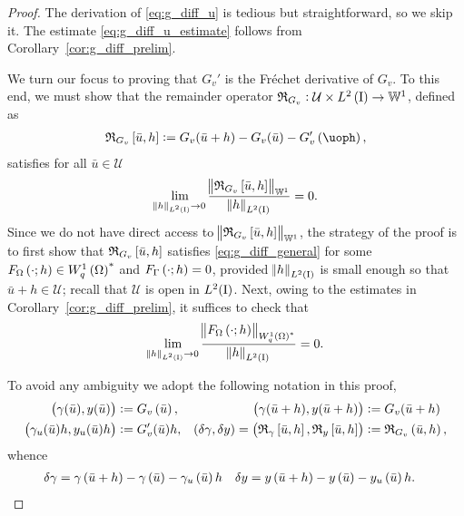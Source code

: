 \documentclass[final]{siamltex}
\begin{document}
\begin{proof} The derivation of \eqref{eq:g_diff_u} is tedious but straightforward, so we skip it. The estimate \eqref{eq:g_diff_u_estimate} follows from Corollary~\ref{cor:g_diff_prelim}.

We turn our focus to proving that $G_v'$ is the Fr\'echet derivative of $G_v$. To this end, we must show that the remainder operator ${\mathfrak{R}}_{G_v}: {\mathcal{U}} \times {{L^2\del{{\text{\rm I}}}}} \to {\mathbb{W}}^1$, defined as
	\begin{align} \label{eq:frechet_deriv}
	    {\mathfrak{R}}_{G_v}\sbr{{\bar{u}}, h} := G_v({\bar{u}} + h) - G_v({\bar{u}}) - G_v'\del\uoph , 
	\end{align}
satisfies for all ${\bar{u}} \in {\mathcal{U}}$
	\[
	     \lim_{{\norm{{h}}_{{L^2\del{{{\text{\rm I}}}}}}} \to 0} \frac{\norm{{\mathfrak{R}}_{G_v}\sbr{{\bar{u}}, h}}_{{\mathbb{W}}^1}}{{\norm{{h}}_{{L^2\del{{{\text{\rm I}}}}}}}}  = 0.
	\]     
Since we do not have direct access to $\norm{{\mathfrak{R}}_{G_v}\sbr{{\bar{u}},
    h}}_{{\mathbb{W}}^1}$, the strategy of the proof is to first show that
${\mathfrak{R}}_{G_v}\sbr{{\bar{u}}, h}$ satisfies  \eqref{eq:g_diff_general} for
some $F_\Omega\del{\cdot;h} \in {{W^{1}_{q}\del{\Omega}}}^*$ and $F_\Gamma\del{\cdot;h} = 0$,
provided ${\norm{{h}}_{{L^2\del{{{\text{\rm I}}}}}}}$ is small enough so that ${\bar{u}} + h \in {\mathcal{U}}$; recall
  that ${\mathcal{U}}$ is open in $L^2({\text{\rm I}})$. Next, owing to the estimates in Corollary~\ref{cor:g_diff_prelim}, it suffices to check that 
	\[
		\lim_{{\norm{{h}}_{{L^2\del{{{\text{\rm I}}}}}}} \to 0} \frac{{\norm{{F_\Omega\del{\cdot;h}}}_{{{W^{{1}}_{{q}}\del{{\Omega}}}}^*}}}{{\norm{{h}}_{{L^2\del{{{\text{\rm I}}}}}}}}  = 0.
	\]
 
To avoid any ambiguity we adopt the following notation in this proof, 
	\begin{align*}
		\del{\gamma({\bar{u}}), y({\bar{u}})} &:= G_v\del{\bar{u}},  &\del{\gamma({\bar{u}}+h), y({\bar{u}}+h)} &:= G_v({\bar{u}}+h) \\
		\del{\gamma_u({\bar{u}})h, y_u({\bar{u}})h} &:= G'_v({\bar{u}})h, &\del{\delta\gamma, \delta y} = \del{{\mathfrak{R}}_\gamma\sbr{{\bar{u}},h},{\mathfrak{R}}_y\sbr{{\bar{u}},h}} &:= {\mathfrak{R}}_{G_v}\del{{\bar{u}}, h},
	\end{align*}
whence 
	\begin{align*}
		\delta\gamma &= \gamma\del{{\bar{u}} + h} - \gamma\del{\bar{u}} - \gamma_u\del{\bar{u}} h
		&\delta y &= y\del{{\bar{u}} + h} - y\del{\bar{u}} - y_u\del{\bar{u}} h.
	\end{align*}


\end{proof}
\end{document}
